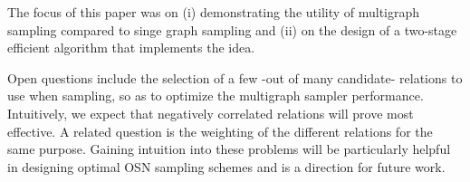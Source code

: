 \documentclass[10pt, conference]{./IEEEtran}
\begin{document}
The focus of this paper was on (i) demonstrating the utility of multigraph sampling compared to singe graph sampling and (ii) on the design of a two-stage efficient algorithm that implements the idea.
%

Open questions include the selection of a few -out of many candidate- relations to use when sampling, so as to optimize the multigraph sampler performance.  Intuitively, we expect that negatively correlated relations will prove most effective. A related question is the weighting of the different relations for the same purpose. Gaining intuition into these problems will be particularly helpful in designing optimal OSN sampling schemes and is a direction for future work.







{


}

%

\vfill
\balance
\end{document}
